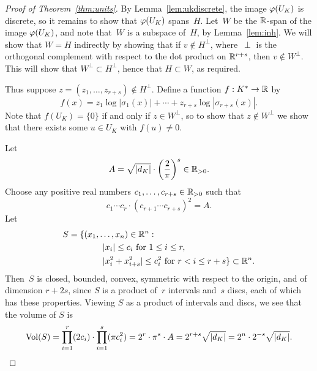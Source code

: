 \begin{proof}[Proof of Theorem~\ref{thm:units}]
By Lemma~\ref{lem:ukdiscrete}, the image $\varphi(U_K)$
is discrete, so it remains to show that $\varphi(U_K)$
spans~$H$.  
Let~$W$ be the $\mathbb{R}$-span of the image
$\varphi(U_K)$, and note that~$W$ is a subspace of~$H$,
by Lemma~\ref{lem:inh}.  We will show
that $W=H$ indirectly by showing that if $v\not \in H^{\perp}$,
where~$\perp$ is the orthogonal complement 
with respect to the dot product on $\mathbb{R}^{r+s}$, then
$v\not \in W^{\perp}$.  This will show that $W^{\perp}\subset
H^{\perp}$, hence that $H\subset W$, as required.

Thus suppose $z=(z_1,\ldots,z_{r+s})\not\in H^{\perp}$.  
Define a function $f:K^*\to \mathbb{R}$ by 
\begin{equation}\label{eqn:f}
  f(x) = z_1\log|\sigma_1(x)| + \cdots + z_{r+s}\log|\sigma_{r+s}(x)|.
\end{equation}
Note that $f(U_K)=\{0\}$ if and only if $z\in W^{\perp}$,
so to show that $z\not\in W^{\perp}$ we show that there exists some $u\in
U_K$ with $f(u)\neq 0$.

Let 
$$
  A=\sqrt{|d_K|} \cdot \left( \frac{2}{\pi}\right)^s \in \mathbb{R}_{>0}.
$$
Choose any positive real numbers $c_1,\ldots, c_{r+s} \in \mathbb{R}_{>0}$
such that
$$
  c_1\cdots c_r\cdot (c_{r+1}\cdots c_{r+s})^2 = A.
$$
Let 
\begin{align*}
  S &= \{(x_1,\ldots,x_n) \in \mathbb{R}^n : \\
    &\qquad\qquad |x_i|\leq c_i\text{ for } 1\leq i \leq r,\\
    &\qquad\qquad |x_i^2 + x_{i+s}^2| \leq c_i^2 \text{ for } r<i\leq r+s\} \subset \mathbb{R}^n.
\end{align*}
Then~$S$ is closed, bounded, convex, symmetric with respect to the
origin, and of dimension $r+2s$, since $S$ is a product of~$r$ intervals
and~$s$ discs, each of which has these properties.
Viewing $S$ as a product of intervals and discs, we see that the volume of $S$ is
$$
  \operatorname{Vol}(S) = \prod_{i=1}^r (2c_i) \cdot \prod_{i=1}^s (\pi c_i^2) 
          = 2^r\cdot \pi^s \cdot A
  = 2^{r+s}\sqrt{|d_K|} = 2^n \cdot 2^{-s}\sqrt{|d_K|}.
$$


\end{proof}
